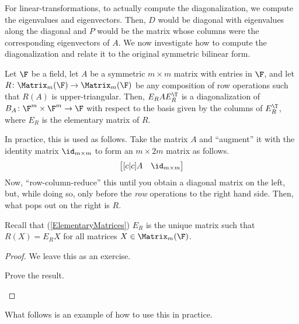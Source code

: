 For linear-transformations, to actually compute the diagonalization, we compute the eigenvalues and eigenvectors.  Then, $D$ would be diagonal with eigenvalues along the diagonal and $P$ would be the matrix whose columns were the corresponding eigenvectors of $A$.  We now investigate how to compute the diagonalization and relate it to the original symmetric bilinear form.
\begin{thm}{}{}
	Let $\F$ be a field, let $A$ be a symmetric $m\times m$ matrix with entries in $\F$, and let $R\colon \Matrix _m(\F )\rightarrow \Matrix _m(\F )$ be any composition of row operations such that $R(A)$ is upper-triangular.  Then, $E_RAE_R^{\T}$ is a diagonalization of $B_A\colon \F ^m\times \F ^m\rightarrow \F$ with respect to the basis given by the columns of $E_R^{\T}$, where $E_R$ is the elementary matrix of $R$.
	\begin{rmk}
		In practice, this is used as follows.  Take the matrix $A$ and ``augment'' it with the identity matrix $\id _{m\times m}$ to form an $m\times 2m$ matrix as follows.
		\begin{equation}
			\begin{bmatrix}[c | c]
				A & \id _{m\times m}
			\end{bmatrix}
		\end{equation}
		Now, ``row-column-reduce'' this until you obtain a diagonal matrix on the left, but, while doing so, only before the \emph{row} operations to the right hand side.  Then, what pops out on the right is $R$.
	\end{rmk}
	\begin{rmk}
		Recall that (\cref{ElementaryMatrices}) $E_R$ is the unique matrix such that $R(X)=E_RX$ for all matrices $X\in \Matrix _m(\F )$.
	\end{rmk}
	\begin{proof}
		We leave this as an exercise.
		\begin{exr}[breakable=false]{}{}
			Prove the result.
		\end{exr}
	\end{proof}
\end{thm}
What follows is an example of how to use this in practice.
